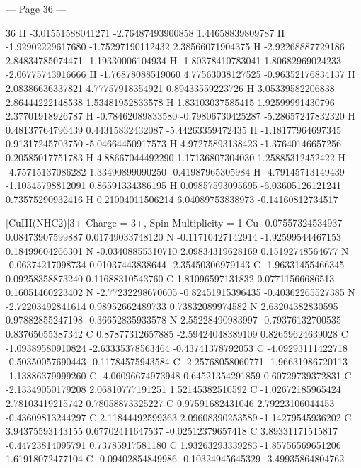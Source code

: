 \documentclass{article}
\begin{document}
--- Page 36 ---
 
36 
  H   -3.01551588041271     -2.76487493900858      1.44658839809787 
  H   -1.92902229617680     -1.75297190112432      2.38566071904375 
  H   -2.92268887729186      2.84834785074471     -1.19330006104934 
  H   -1.80378410783041      1.80682969024233     -2.06775743916666 
  H   -1.76878088519060      4.77563038127525     -0.96352176834137 
  H   2.08386636337821      4.77757918354921      0.89433559223726 
  H   3.05339582206838      2.86444222148538      1.53481952833578 
  H   1.83103037585415      1.92599991430796      2.37701918926787 
  H   -0.78462089833580     -0.79806730425287     -5.28657247832320 
  H   0.48137764796439      0.44315832432087     -5.44263359472435 
  H   -1.18177964697345      0.91317245703750     -5.04664450917573 
  H   4.97275893138423     -1.37640146657256      0.20585017751783 
  H   4.88667044492290      1.17136807304030      1.25885312452422 
  H   -4.75715137086282      1.33490899090250     -0.41987965305984 
  H   -4.79145713149439     -1.10545798812091      0.86591334386195 
  H   0.09857593095695     -6.03605126121241      0.73575290932416 
  H   0.21004011506214      6.04089753838973     -0.14160812734517 
 
[CuIII(NHC2)]3+ 
Charge = 3+, Spin Multiplicity = 1 
  Cu  -0.07557324534937      0.08473907599887      0.01749033748120 
  N   -0.11710427142914     -1.92599544467153      0.18499604266301 
  N   -0.03408855310710      2.09834319628169      0.15192748564677 
  N   -0.06374217098734      0.01037443838644     -2.35450306979143 
  C   -1.96331455466345      0.09258358873240      0.11688310543760 
  C   1.81096597131832      0.07711566686513      0.16051460223402 
  N   -2.77232298670605     -0.82451915396435     -0.40362265527385 
  N   -2.72203492841614      0.98952662489733      0.73832089974582 
  N   2.63204382830595      0.97882855247198     -0.36652835933578 
  N   2.55228490983997     -0.79376132700535      0.83765055387342 
  C   0.87877312657885     -2.59424048389109      0.82659624639028 
  C   -1.09389580910824     -2.63335378563464     -0.43741378792053 
  C   -4.09293111422718     -0.50350057690443     -0.11784575943584 
  C   -2.25768058060771     -1.96631986720113     -1.13886379999260 
  C   -4.06096674973948      0.64521354291859      0.60729739372831 
  C   -2.13349050179208      2.06810777191251      1.52145382510592 
  C   -1.02672185965424      2.78103419215742      0.78058873325227 
  C   0.97591682431046      2.79223106044453     -0.43609813244297 
  C   2.11844492599363      2.09608390253589     -1.14279545936202 
  C   3.94375593143155      0.67702411647537     -0.02512379657418 
  C   3.89331171515817     -0.44723814095791      0.73785917581180 
  C   1.93263293339283     -1.85756569651206      1.61918072477104 
  C   -0.09402854849986     -0.10324945645329     -3.49935864804762 
\end{document}
